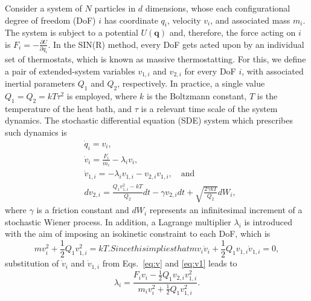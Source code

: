 \documentclass[
    journal=jctcce,
    layout=twocolumn
]{achemso}
\newcommand{\vt}[1]{\boldsymbol{\mathbf{#1}}}   %
\newcommand{\diff}[2]{\frac{\partial #2}{\partial #1}} %
\newcommand{\dof}{i}   %
\begin{document}
Consider a system of $N$ particles in $d$ dimensions, whose each configurational degree of freedom (DoF) $\dof$ has coordinate $q_\dof$, velocity $v_\dof$, and associated mass $m_\dof$.
The system is subject to a potential $U(\vt q)$ and, therefore, the force acting on $\dof$ is $F_\dof = -\diff{q_\dof}{U}$.
In the SIN(R) method, every DoF gets acted upon by an individual set of thermostats, which is known as massive thermostatting.
For this, we define a pair of extended-system variables $v_{1,\dof}$ and $v_{2,\dof}$ for every DoF $\dof$, with associated inertial parameters $Q_1$ and $Q_2$, respectively.
In practice, a single value $Q_1 = Q_2 = kT\tau^2$ is employed, where $k$ is the Boltzmann constant, $T$ is the temperature of the heat bath, and $\tau$ is a relevant time scale of the system dynamics.
The stochastic differential equation (SDE) system which prescribes such dynamics is
\begin{subequations}
\label{eq:equations of motion}
\begin{align}
& \dot{q}_\dof = v_\dof, \label{eq:q} \\
& \dot{v}_\dof = \frac{F_\dof}{m_\dof} - \lambda_\dof v_\dof, \label{eq:v} \\
& \dot{v}_{1,\dof} = - \lambda_\dof v_{1,\dof} - v_{2,\dof} v_{1,\dof}, \quad \mathrm{and}  \label{eq:v1} \\
& dv_{2,\dof} = \tfrac{Q_1 v_{1,\dof}^2 - kT}{Q_2}dt - \gamma v_{2,\dof} dt + \sqrt{\tfrac{2 \gamma kT}{Q_2}} dW_\dof, \label{eq:v2}
\end{align}
\end{subequations}
where $\gamma$ is a friction constant and $dW_\dof$ represents an infinitesimal increment of a stochastic Wiener process.
In addition, a Lagrange multiplier $\lambda_\dof$ is introduced with the aim of imposing an isokinetic constraint to each DoF, which is \cite{Leimkuhler_2013, Margul_2016}
\begin{subequations}
\label{eq:isokinetic constraint}
\begin{equation}
m v_\dof^2 + \frac{1}{2} Q_1 v_{1,\dof}^2 = kT.
\end{equation}

Since this implies that
\begin{equation}
\label{eq:isokinetic constraint derivative}
m v_\dof \dot{v}_\dof + \frac{1}{2} Q_1 v_{1,\dof}\dot{v}_{1,\dof} = 0,
\end{equation}
\end{subequations}
substitution of $\dot{v}_\dof$ and $\dot{v}_{1,\dof}$ from Eqs.~\eqref{eq:v} and \eqref{eq:v1} leads to
\begin{equation}
\lambda_\dof = \frac{F_\dof v_\dof - \frac{1}{2} Q_1 v_{2,\dof} v_{1,\dof}^2}{m_\dof v_\dof^2 + \frac{1}{2} Q_1 v_{1,\dof}^2}.
\end{equation}
\end{document}
